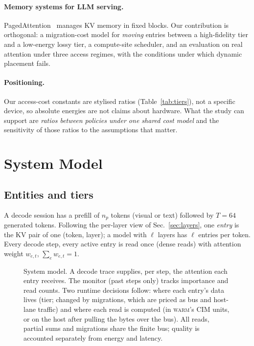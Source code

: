 \documentclass[10pt,a4paper]{article}
\newcommand{\warm}{\textsc{warm}}
\begin{document}
\paragraph{Memory systems for LLM serving.} PagedAttention~\cite{vllm} manages KV memory in fixed blocks. Our contribution is orthogonal: a migration-cost model for \emph{moving} entries between a high-fidelity tier and a low-energy lossy tier, a compute-site scheduler, and an evaluation on real attention under three access regimes, with the conditions under which dynamic placement fails.

\paragraph{Positioning.} Our access-cost constants are stylised ratios (Table~\ref{tab:tiers}), not a specific device, so absolute energies are not claims about hardware. What the study can support are \emph{ratios between policies under one shared cost model} and the sensitivity of those ratios to the assumptions that matter.

\section{System Model}
\subsection{Entities and tiers}
A decode session has a prefill of $n_p$ tokens (visual or text) followed by $T{=}64$ generated tokens. Following the per-layer view of Sec.~\ref{sec:layers}, one \emph{entry} is the KV pair of one (token, layer); a model with $\ell$ layers has $\ell$ entries per token. Every decode step, every active entry is read once (dense reads) with attention weight $w_{e,t}$, $\sum_e w_{e,t}{=}1$.

\begin{figure}[t]
\centering

\caption{System model. A decode trace supplies, per step, the attention each entry receives. The monitor (past steps only) tracks importance and read counts. Two runtime decisions follow: where each entry's data lives (tier; changed by migrations, which are priced as bus and host-lane traffic) and where each read is computed (in \warm{}'s CIM units, or on the host after pulling the bytes over the bus). All reads, partial sums and migrations share the finite bus; quality is accounted separately from energy and latency.}
\label{fig:arch}
\end{figure}
\end{document}
